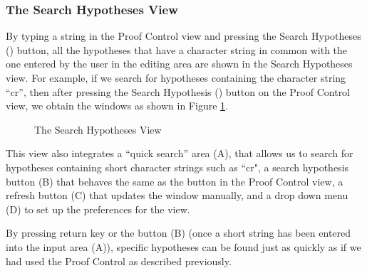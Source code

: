 


\subsubsection{The Search Hypotheses View}

By typing a string in the \textsf{Proof Control} view and pressing the \textsf{Search Hypotheses} () button, all the  hypotheses that have a character string in common with the one entered by the user in the editing area are shown in the Search Hypotheses view. For example, if we search for hypotheses containing the character string ``cr'', then after pressing the \textsf{Search Hypothesis} () button on the \textsf{Proof Control} view, we obtain the windows as shown in Figure \ref{fig_ref_01_proving_perspective7}. 

\begin{figure}[!ht]
\begin{center}
	\caption{The Search Hypotheses View}
	\label{fig_ref_01_proving_perspective7}
\end{center}
\end{figure}

This view also integrates a ``quick search'' area (A), that allows us to search for hypotheses containing short character strings such as ``cr", a search hypothesis button (B) that behaves the same as the button in the Proof Control view, a refresh button (C) that updates the window manually, and a drop down menu (D) to set up the preferences for the view.

By pressing return key or the button (B) (once a short string has been entered into the input area (A)), specific hypotheses can be found just as quickly as if we had used the Proof Control as described previously.

